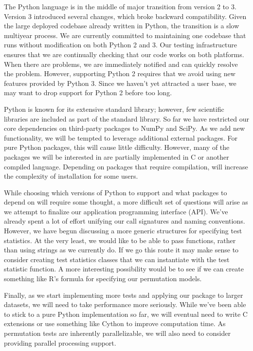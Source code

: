 The Python language is in the middle of major transition from version 2 to
3.  Version 3 introduced several changes, which broke backward compatibility.
Given the large deployed codebase already written in Python, the transition
is a slow multiyear process.  We are currently committed to maintaining one
codebase that runs without modification on both Python 2 and 3.  Our testing
infrastructure ensures that we are continually checking that our code works
on both platforms.  When there are problems, we are immediately notified and
can quickly resolve the problem.  However, supporting Python 2 requires that
we avoid using new features provided by Python 3.  Since we haven't yet
attracted a user base, we may want to drop support for Python 2 before
too long.

Python is known for its extensive standard library; however, few scientific
libraries are included as part of the standard library.  So far we have
restricted our core dependencies on third-party packages to NumPy and SciPy.
As we add new functionality, we will be tempted to leverage additional
external packages.  For pure Python packages, this will cause little
difficulty.  However, many of the packages we will be interested in
are partially implemented in C or another compiled language.  Depending
on packages that require compilation, will increase the complexity
of installation for some users.

While choosing which versions of Python to support and what packages to depend
on will require some thought, a more difficult set of questions will arise as
we attempt to finalize our application programming interface (API).  We've
already spent a lot of effort unifying our call signatures and naming
conventions.  However, we have begun discussing a more generic structures for
specifying test statistics.  At the very least, we would like to be able to
pass functions, rather than using strings as we currently do.  If we go this
route it may make sense to consider creating test statistics classes that
we can instantiate with the test statistic function.  A more interesting
possibility would be to see if we can create something like R's formula
for specifying our permutation models.

Finally, as we start implementing more tests and applying our package
to larger datasets, we will need to take performance more seriously.
While we've been able to stick to a pure Python implementation so far,
we will eventual need to write C extensions or use something like
Cython to improve computation time.  As permutation tests are inherently
parallelizable, we will also need to consider providing parallel processing
support.
